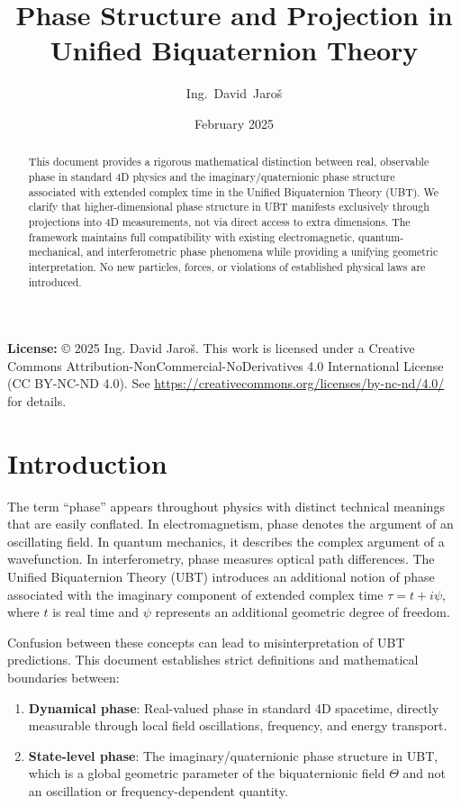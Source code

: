 \documentclass[12pt]{article}
\title{Phase Structure and Projection in Unified Biquaternion Theory}
\author{Ing.~David~Jaroš}
\date{February 2025}
\begin{document}
\maketitle

\noindent
\textbf{License:} © 2025 Ing. David Jaroš. This work is licensed under a Creative Commons Attribution-NonCommercial-NoDerivatives 4.0 International License (CC BY-NC-ND 4.0). See \url{https://creativecommons.org/licenses/by-nc-nd/4.0/} for details.

\vspace{1em}

\begin{abstract}
This document provides a rigorous mathematical distinction between real, observable phase in standard 4D physics and the imaginary/quaternionic phase structure associated with extended complex time in the Unified Biquaternion Theory (UBT). We clarify that higher-dimensional phase structure in UBT manifests exclusively through projections into 4D measurements, not via direct access to extra dimensions. The framework maintains full compatibility with existing electromagnetic, quantum-mechanical, and interferometric phase phenomena while providing a unifying geometric interpretation. No new particles, forces, or violations of established physical laws are introduced.
\end{abstract}

\tableofcontents

\section{Introduction}

The term ``phase'' appears throughout physics with distinct technical meanings that are easily conflated. In electromagnetism, phase denotes the argument of an oscillating field. In quantum mechanics, it describes the complex argument of a wavefunction. In interferometry, phase measures optical path differences. The Unified Biquaternion Theory (UBT) introduces an additional notion of phase associated with the imaginary component of extended complex time $\tau = t + i\psi$, where $t$ is real time and $\psi$ represents an additional geometric degree of freedom.

Confusion between these concepts can lead to misinterpretation of UBT predictions. This document establishes strict definitions and mathematical boundaries between:
\begin{enumerate}
\item \textbf{Dynamical phase}: Real-valued phase in standard 4D spacetime, directly measurable through local field oscillations, frequency, and energy transport.
\item \textbf{State-level phase}: The imaginary/quaternionic phase structure in UBT, which is a global geometric parameter of the biquaternionic field $\Theta$ and not an oscillation or frequency-dependent quantity.
\end{enumerate}
\end{document}
